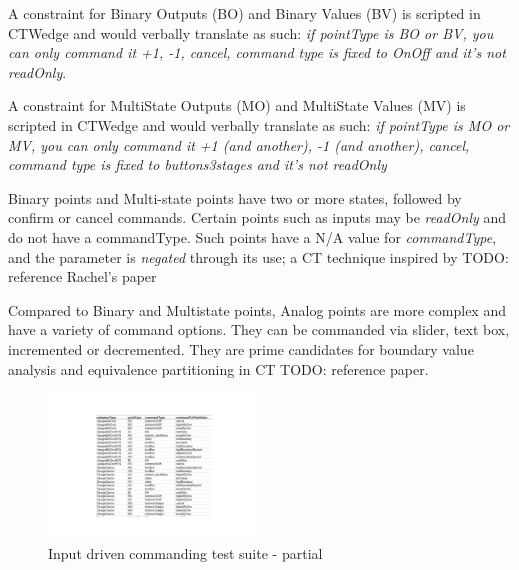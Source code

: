 \documentclass[conference]{IEEEtran}
\newcommand{\todo}[1]{}
\renewcommand{\todo}[1]{{\color{red} TODO: {#1}}}
\begin{document}
	A constraint for Binary Outputs (BO) and Binary Values (BV) is scripted in CTWedge and would verbally translate as such:
	\textit{if pointType is BO or BV, you can only command it +1, -1, cancel, command type is fixed to OnOff and it's not readOnly}.
	
	A constraint for MultiState Outputs (MO) and MultiState Values (MV) is scripted in CTWedge and would verbally translate as such:
	\textit{if pointType is MO or MV, you can only command it +1 (and another), -1 (and another), cancel, command type is fixed to buttons3stages and it's not readOnly}

	Binary points and Multi-state points have two or more states, followed by confirm or cancel commands. 
	Certain points such as inputs may be \textit{readOnly} and do not have a commandType. Such points have a N/A value for \textit{commandType}, and the parameter is \textit{negated} through its use; a CT technique inspired by \todo{reference Rachel's paper}	

	Compared to  Binary and Multistate points, Analog points are more complex and have a variety of command options.
	They can be commanded via slider, text box, incremented or decremented. 
	They are prime candidates for boundary value analysis and equivalence partitioning in CT \todo{reference paper}.
	
	\begin{figure}[!b]
		\includegraphics[width=0.50\textwidth,]{csvOutputCommanding.pdf}
		\caption{Input driven commanding test suite - partial}
		\label{fig:csvOutputCommanding}
	\end{figure}
\end{document}

